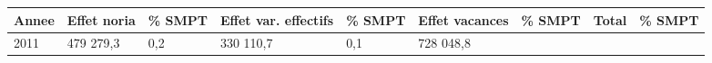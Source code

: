 \begin{longtable}[]{@{}lllllllll@{}}
\toprule
\begin{minipage}[b]{0.05\columnwidth}\raggedright
Annee\strut
\end{minipage} & \begin{minipage}[b]{0.10\columnwidth}\raggedright
Effet noria\strut
\end{minipage} & \begin{minipage}[b]{0.06\columnwidth}\raggedright
\% SMPT\strut
\end{minipage} & \begin{minipage}[b]{0.16\columnwidth}\raggedright
Effet var. effectifs\strut
\end{minipage} & \begin{minipage}[b]{0.06\columnwidth}\raggedright
\% SMPT\strut
\end{minipage} & \begin{minipage}[b]{0.12\columnwidth}\raggedright
Effet vacances\strut
\end{minipage} & \begin{minipage}[b]{0.06\columnwidth}\raggedright
\% SMPT\strut
\end{minipage} & \begin{minipage}[b]{0.10\columnwidth}\raggedright
Total\strut
\end{minipage} & \begin{minipage}[b]{0.06\columnwidth}\raggedright
\% SMPT\strut
\end{minipage}\tabularnewline
\midrule
\endhead
\begin{minipage}[t]{0.05\columnwidth}\raggedright
2011\strut
\end{minipage} & \begin{minipage}[t]{0.10\columnwidth}\raggedright
479 279,3\strut
\end{minipage} & \begin{minipage}[t]{0.06\columnwidth}\raggedright
0,2\strut
\end{minipage} & \begin{minipage}[t]{0.16\columnwidth}\raggedright
330 110,7\strut
\end{minipage} & \begin{minipage}[t]{0.06\columnwidth}\raggedright
0,1\strut
\end{minipage} & \begin{minipage}[t]{0.12\columnwidth}\raggedright
728 048,8\strut
\end{minipage} & \begin{minipage}[t]{0.06\columnwidth}\raggedright

\end{minipage}
\end{longtable}
